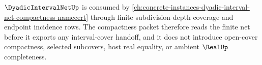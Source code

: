 $\DyadicIntervalNetUp$ is consumed by \autoref{ch:concrete-instances-dyadic-interval-net-compactness-namecert} through finite subdivision-depth coverage and endpoint incidence rows. The compactness packet therefore reads the finite net before it exports any interval-cover handoff, and it does not introduce open-cover compactness, selected subcovers, host real equality, or ambient $\RealUp$ completeness.
